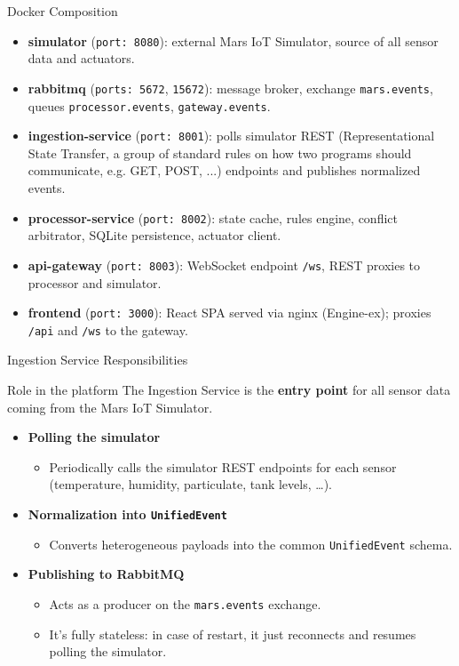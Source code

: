 \documentclass[aspectratio=169]{beamer}
\begin{document}
\begin{frame}{Docker Composition}
  \begin{itemize}
    \item \textbf{simulator} (\texttt{port: 8080}): external Mars IoT Simulator, source of all sensor data and actuators.
    \item \textbf{rabbitmq} (\texttt{ports: 5672}, \texttt{15672}): message broker, exchange \texttt{mars.events}, queues \texttt{processor.events}, \texttt{gateway.events}.
    \item \textbf{ingestion-service} (\texttt{port: 8001}): polls simulator REST (Representational State Transfer, a group of standard rules on how two programs should communicate, e.g. GET, POST, ...) endpoints and publishes normalized events.
    \item \textbf{processor-service} (\texttt{port: 8002}): state cache, rules engine, conflict arbitrator, SQLite persistence, actuator client.
    \item \textbf{api-gateway} (\texttt{port: 8003}): WebSocket endpoint \texttt{/ws}, REST proxies to processor and simulator.
    \item \textbf{frontend} (\texttt{port: 3000}): React SPA served via nginx (Engine-ex); proxies \texttt{/api} and \texttt{/ws} to the gateway.
  \end{itemize}
\end{frame}

\begin{frame}{Ingestion Service Responsibilities}
  \begin{block}{Role in the platform}
    The Ingestion Service is the \textbf{entry point} for all sensor data coming from the Mars IoT Simulator.
  \end{block}
  \vspace{0.15cm}
  \begin{itemize}
    \item \textbf{Polling the simulator}
      \begin{itemize}
        \item Periodically calls the simulator REST endpoints for each sensor (temperature, humidity, particulate, tank levels, \dots).
      \end{itemize}
    \item \textbf{Normalization into \texttt{UnifiedEvent}}
      \begin{itemize}
        \item Converts heterogeneous payloads into the common \texttt{UnifiedEvent} schema.
      \end{itemize}
    \item \textbf{Publishing to RabbitMQ}
      \begin{itemize}
        \item Acts as a producer on the \texttt{mars.events} exchange.
        \item It's fully stateless: in case of restart, it just reconnects and resumes polling the simulator.
      \end{itemize}
  \end{itemize}
\end{frame}
\end{document}

